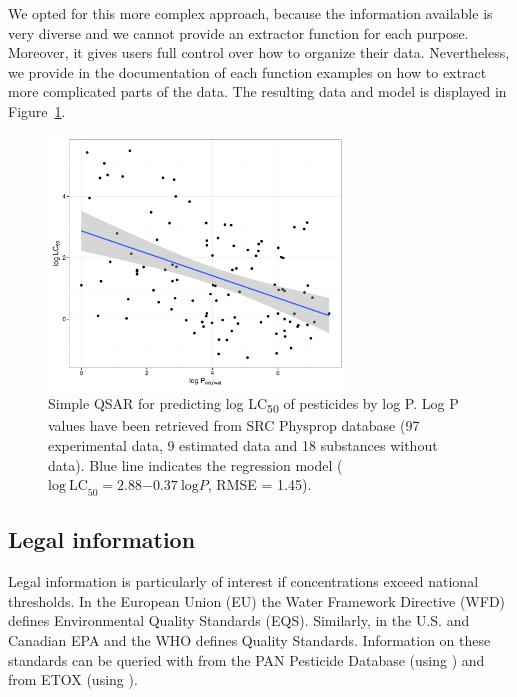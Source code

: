\documentclass[article, shortnames]{jss}\usepackage[]{graphicx}\usepackage[]{color}
\begin{document}
\begin{CodeChunk}
\end{CodeChunk}

We opted for this more complex approach, because the information available is very diverse and we cannot provide an extractor function for each purpose.
Moreover, it gives users full control over how to organize their data. 
Nevertheless, we provide in the documentation of each function examples on how to extract more complicated parts of the data.
The resulting data and model is displayed in Figure~\ref{fig:fig3}.

\begin{figure}[ht]
\begin{CodeChunk}


{\centering \includegraphics[width=0.7\textwidth]{plot_qsar-1} 

}

\end{CodeChunk}
\caption{Simple QSAR for predicting log LC\textsubscript{50} of pesticides by log P. 
Log P values have been retrieved from SRC Physprop database (97 experimental data, 9 estimated data and 18 substances without data). 
Blue line indicates the regression model ($\mathrm{log~LC}_{50} = 2.88\ensuremath{-0.37}~\mathrm{log} P$, RMSE = 1.45).}
\label{fig:fig3}
\end{figure}


\subsection[Legal information]{Legal information}
Legal information is particularly of interest if concentrations exceed national thresholds.
In the European Union (EU) the Water Framework Directive (WFD) defines Environmental Quality Standards (EQS).
Similarly, in the U.S. and Canadian EPA and the WHO defines Quality Standards.
Information on these standards can be queried with  from the PAN Pesticide Database (using ) and from ETOX (using ).
\end{document}
